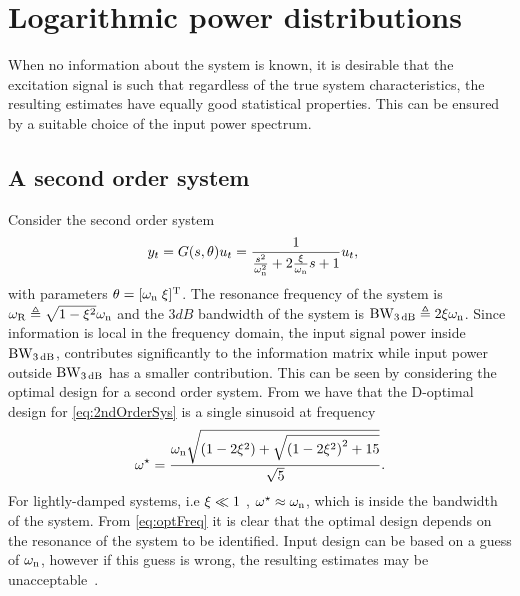 

\section{Logarithmic power distributions}\label{sec:logarithmic}
When no information about the system is known, it is desirable that
the excitation signal is such that regardless of the true system characteristics,
the resulting estimates have equally good statistical properties.
This can be ensured by a suitable choice of the input power spectrum.

 \subsection{A second order system}
Consider the second order system
\begin{align}
y_t &= G(s,\theta) u_t = \frac{1}{\frac{s^2}{\omega_{\mathrm{n}}^2} + 2\frac{\xi}{\omega_{\mathrm{n}}}s + 1}u_t,
\label{eq:2ndOrderSys}
\end{align}
with parameters $\theta=[\omega_{\mathrm{n}}\;\xi]^{\mathrm{T}}$. The resonance frequency of the system is $\omega_{\mathrm{R}} \triangleq \sqrt{1-\xi^2}\omega_{\mathrm{n}}$
and the $3\unit{dB}$ bandwidth of the system is $\mathrm{BW}_{3\,\mathrm{dB}} \triangleq 2\xi\omega_{\mathrm{n}}$.
Since information is local in the frequency domain, the input signal power inside $\mathrm{BW}_{3\,\mathrm{dB}}$, contributes significantly to the information matrix while input power outside $\mathrm{BW}_{3\,\mathrm{dB}}$ has a smaller contribution. This can be seen by considering the optimal design for a second order system. From \citep[Example 6.4.5]{Goodwin1977} we have that the D-optimal design for \eqref{eq:2ndOrderSys} is a single sinusoid at frequency
\begin{align}
\omega^\star =\frac%
{\wn
  \sqrt{
    \left(1-2\damping^2\right)
    +
    \sqrt{\left(1-2\damping^2\right)^2+15}
    }
  }
{\sqrt{5}}.
\label{eq:optFreq}
\end{align}
For lightly-damped systems, i.e $\xi \ll 1$ , $\omega^\star\approx \omega_{\mathrm{n}}$, which is inside the bandwidth of the system. 
From \eqref{eq:optFreq} it is clear that the optimal design depends on the resonance of the system to be identified. 
Input design can be based on a guess of $\omega_{\mathrm{n}}$, however if this guess is wrong, the resulting estimates may be unacceptable~\citep{Rojas2007}.


